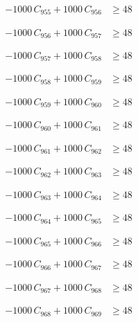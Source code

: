 \documentclass[a4paper,11pt]{article}
\begin{document}
\begin{align}
-1000\,C_{955} + 1000\,C_{956} &\geq 48 \nonumber
\end{align}

\begin{align}
-1000\,C_{956} + 1000\,C_{957} &\geq 48 \nonumber
\end{align}

\begin{align}
-1000\,C_{957} + 1000\,C_{958} &\geq 48 \nonumber
\end{align}

\begin{align}
-1000\,C_{958} + 1000\,C_{959} &\geq 48 \nonumber
\end{align}

\begin{align}
-1000\,C_{959} + 1000\,C_{960} &\geq 48 \nonumber
\end{align}

\begin{align}
-1000\,C_{960} + 1000\,C_{961} &\geq 48 \nonumber
\end{align}

\begin{align}
-1000\,C_{961} + 1000\,C_{962} &\geq 48 \nonumber
\end{align}

\begin{align}
-1000\,C_{962} + 1000\,C_{963} &\geq 48 \nonumber
\end{align}

\begin{align}
-1000\,C_{963} + 1000\,C_{964} &\geq 48 \nonumber
\end{align}

\begin{align}
-1000\,C_{964} + 1000\,C_{965} &\geq 48 \nonumber
\end{align}

\begin{align}
-1000\,C_{965} + 1000\,C_{966} &\geq 48 \nonumber
\end{align}

\begin{align}
-1000\,C_{966} + 1000\,C_{967} &\geq 48 \nonumber
\end{align}

\begin{align}
-1000\,C_{967} + 1000\,C_{968} &\geq 48 \nonumber
\end{align}

\begin{align}
-1000\,C_{968} + 1000\,C_{969} &\geq 48 \nonumber
\end{align}
\end{document}
